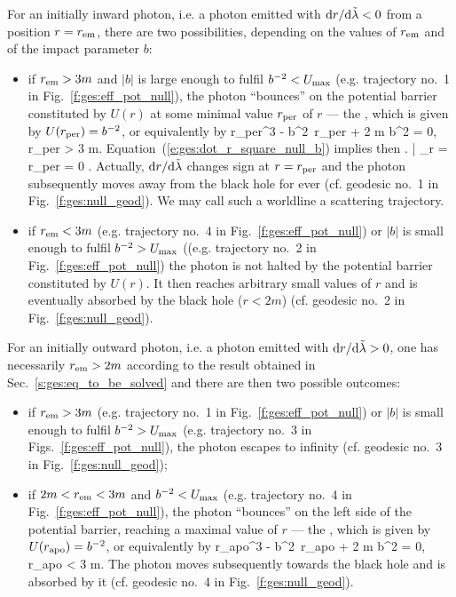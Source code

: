 For an initially inward photon, i.e. a photon emitted with ${\mathrm{d} r}/{\mathrm{d}\tilde{\lambda}} < 0$
from a position $r=r_{\rm em}$, there are
two possibilities, depending on the values of $r_{\rm em}$ and
of the impact parameter $b$:
\begin{itemize}
\item if $r_{\rm em} > 3 m$ and $|b|$ is large enough to fulfil $b^{-2} < U_{\rm max}$
(e.g. trajectory no.~1 in Fig.~\ref{f:ges:eff_pot_null}), the photon
``bounces'' on the potential barrier constituted by $U(r)$
at some minimal value  $r_{\rm per}$ of $r$ --- the ,
which is given by  $U(r_{\rm per}) = b^{-2}$, or equivalently by
\be \label{e:ges:r_per_null}
  r_{\rm per}^3 - b^2\, r_{\rm per} + 2 m b^2 = 0, \quad r_{\rm per} > 3 m.
\ee
Equation~(\ref{e:ges:dot_r_square_null_b})
implies then
\be
    \left.  \right| _{r = r_{\rm per}} = 0 .
\ee
Actually, $\mathrm{d} r / \mathrm{d}\tilde{\lambda}$ changes sign at $r = r_{\rm per}$ and
the photon subsequently moves away from the black hole for ever (cf. geodesic
no.~1 in Fig.~\ref{f:ges:null_geod}). We may call
such a worldline a scattering trajectory.
\item if $r_{\rm em} < 3 m$ (e.g. trajectory
no.~4 in Fig.~\ref{f:ges:eff_pot_null}) or $|b|$ is small enough to fulfil $b^{-2} > U_{\rm max}$ ((e.g. trajectory
no.~2 in Fig.~\ref{f:ges:eff_pot_null}) the photon
is not halted by the potential barrier constituted by $U(r)$. It then reaches arbitrary
small values of $r$ and is eventually absorbed by the black hole ($r < 2m$)
(cf. geodesic no.~2 in Fig.~\ref{f:ges:null_geod}).
\end{itemize}

For an initially outward photon, i.e. a photon emitted with ${\mathrm{d} r}/{\mathrm{d}\tilde{\lambda}} > 0$,
one has necessarily $r_{\rm em}>2m$ according to the result obtained in Sec.~\ref{s:ges:eq_to_be_solved}
and there are then two possible outcomes:

\begin{itemize}
\item if $r_{\rm em} > 3 m$ (e.g. trajectory
no.~1 in Fig.~\ref{f:ges:eff_pot_null}) or
$|b|$ is small enough to fulfil $b^{-2} > U_{\rm max}$ (e.g. trajectory
no.~3 in Figs.~\ref{f:ges:eff_pot_null}), the photon escapes to infinity
(cf. geodesic no.~3 in Fig.~\ref{f:ges:null_geod});
\item if $2m < r_{\rm em} < 3 m$ and $b^{-2} < U_{\rm max}$ (e.g. trajectory
no.~4 in Fig.~\ref{f:ges:eff_pot_null}), the photon ``bounces'' on the left
side of the potential barrier, reaching a maximal value of $r$
--- the ,
which is given by  $U(r_{\rm apo}) = b^{-2}$, or equivalently by
\be \label{e:ges:r_apo_null}
   r_{\rm apo}^3 - b^2\, r_{\rm apo} + 2 m b^2 = 0, \quad r_{\rm apo} < 3 m.
\ee
The photon moves subsequently towards the black hole and
is absorbed by it (cf. geodesic no.~4 in Fig.~\ref{f:ges:null_geod}).
\end{itemize}

